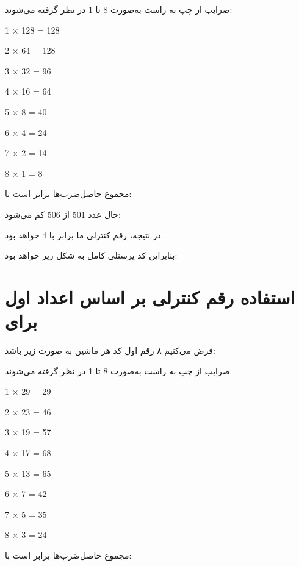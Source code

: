 \documentclass[12pt,a4paper]{report}
\begin{document}
\begin{center}
\end{center}

ضرایب از چپ به راست به‌صورت 8 تا 1 در نظر گرفته می‌شوند:
\begin{center}
	\begin{latin}
		1 × 128 = 128
		
		2 × 64 = 128
		
		3 × 32 = 96
		
		4 × 16 = 64
		
		5 × 8 = 40
		
		6 × 4 = 24
		
		7 × 2 = 14
		
		8 × 1 = 8
		
	\end{latin}
\end{center}
مجموع حاصل‌ضرب‌ها برابر است با:
\begin{center}
\end{center}


حال عدد 501 از 506  کم  می‌شود:
\begin{center}
\end{center}

در نتیجه، رقم کنترلی ما برابر با 4 خواهد بود.

بنابراین کد پرسنلی کامل به شکل زیر خواهد بود:

\begin{center}
\end{center}
\newpage
\section{استفاده  رقم کنترلی  بر اساس اعداد اول برای }
فرض می‌کنیم ۸ رقم اول کد هر ماشین  به صورت زیر باشد:

\begin{center}
\end{center}

ضرایب از چپ به راست به‌صورت 8 تا 1 در نظر گرفته می‌شوند:
\begin{center}
	\begin{latin}
		1 × 29 = 29
		
		2 × 23 = 46
		
		3 × 19 = 57
		
		4 × 17 = 68
		
		5 × 13 = 65
		
		6 × 7 = 42
		
		7 × 5 = 35 
		
		8 × 3 = 24
		
	\end{latin}
\end{center}
مجموع حاصل‌ضرب‌ها برابر است با:
\begin{center}
\end{center}
\end{document}
